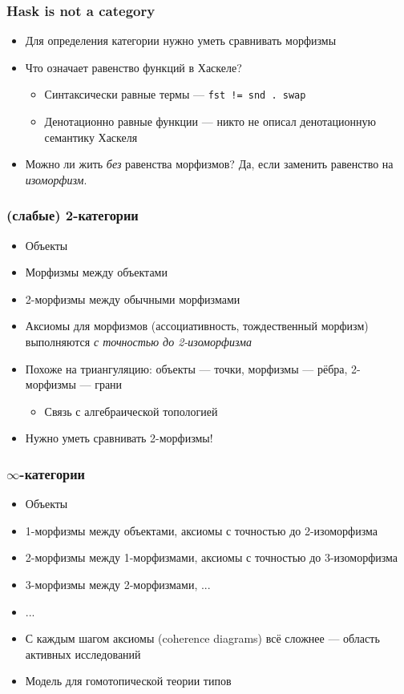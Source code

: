 \documentclass{beamer}
\begin{document}
\begin{frame}
\frametitle{Hask is not a category}
\begin{itemize}
\item Для определения категории нужно уметь сравнивать морфизмы
\item Что означает равенство функций в Хаскеле?
\pause
\begin{itemize}
\item Синтаксически равные термы \pause --- \texttt{fst != snd . swap}
\pause
\item Денотационно равные функции \pause --- никто не описал денотационную семантику Хаскеля
\end{itemize}
\pause
\item Можно ли жить \textit{без} равенства морфизмов? \pause Да, если заменить равенство на \textit{изоморфизм}.
\end{itemize}
\end{frame}

\begin{frame}
\frametitle{(слабые) 2-категории}
\begin{itemize}
\item Объекты
\item Морфизмы между объектами
\pause
\item 2-морфизмы между обычными морфизмами
\pause
\item Аксиомы для морфизмов (ассоциативность, тождественный морфизм) выполняются \textit{с точностью до 2-изоморфизма}
\pause
\item Похоже на триангуляцию: объекты --- точки, морфизмы --- рёбра, 2-морфизмы --- грани
\begin{itemize}
\item Связь с алгебраической топологией
\end{itemize}
\pause
\item Нужно уметь сравнивать 2-морфизмы!
\end{itemize}
\end{frame}

\begin{frame}
\frametitle{\begin{math}\infty\end{math}-категории}
\begin{itemize}
\item Объекты
\item 1-морфизмы между объектами, аксиомы с точностью до 2-изоморфизма
\item 2-морфизмы между 1-морфизмами, аксиомы с точностью до 3-изоморфизма
\item 3-морфизмы между 2-морфизмами, ...
\item ...
\pause
\item С каждым шагом аксиомы (coherence diagrams) всё сложнее --- область активных исследований
\item Модель для гомотопической теории типов
\end{itemize}
\end{frame}
\end{document}
